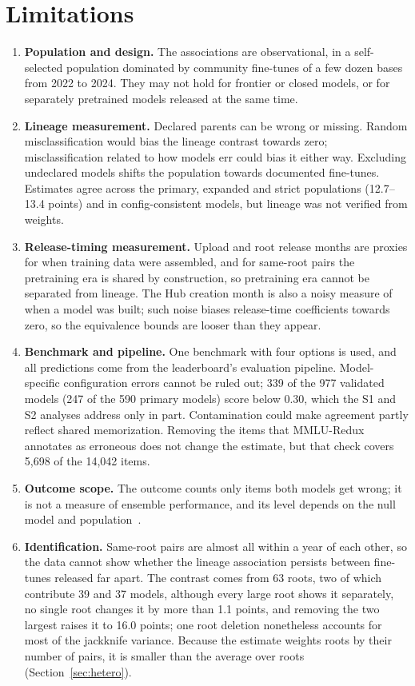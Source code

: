 \documentclass{ieeeaccess}
\theoremstyle{definition}
\theoremstyle{plain}
\begin{document}
\section{Limitations}
\label{sec:limitations}
\begin{enumerate}
\item \textbf{Population and design.} The associations are observational, in a self-selected population dominated by community fine-tunes of a few dozen bases from 2022 to 2024. They may not hold for frontier or closed models, or for separately pretrained models released at the same time.
\item \textbf{Lineage measurement.} Declared parents can be wrong or missing. Random misclassification would bias the lineage contrast towards zero; misclassification related to how models err could bias it either way. Excluding undeclared models shifts the population towards documented fine-tunes. Estimates agree across the primary, expanded and strict populations (12.7--13.4 points) and in config-consistent models, but lineage was not verified from weights.
\item \textbf{Release-timing measurement.} Upload and root release months are proxies for when training data were assembled, and for same-root pairs the pretraining era is shared by construction, so pretraining era cannot be separated from lineage. The Hub creation month is also a noisy measure of when a model was built; such noise biases release-time coefficients towards zero, so the equivalence bounds are looser than they appear.
\item \textbf{Benchmark and pipeline.} One benchmark with four options is used, and all predictions come from the leaderboard's evaluation pipeline. Model-specific configuration errors cannot be ruled out; 339 of the 977 validated models (247 of the 590 primary models) score below 0.30, which the S1 and S2 analyses address only in part. Contamination could make agreement partly reflect shared memorization. Removing the items that MMLU-Redux annotates as erroneous does not change the estimate, but that check covers 5{,}698 of the 14{,}042 items.
\item \textbf{Outcome scope.} The outcome counts only items both models get wrong; it is not a measure of ensemble performance, and its level depends on the null model and population~\cite{jo2026}.
\item \textbf{Identification.} Same-root pairs are almost all within a year of each other, so the data cannot show whether the lineage association persists between fine-tunes released far apart. The contrast comes from 63 roots, two of which contribute 39 and 37 models, although every large root shows it separately, no single root changes it by more than 1.1 points, and removing the two largest raises it to 16.0 points; one root deletion nonetheless accounts for most of the jackknife variance. Because the estimate weights roots by their number of pairs, it is smaller than the average over roots (Section~\ref{sec:hetero}).

\end{enumerate}
\end{document}

